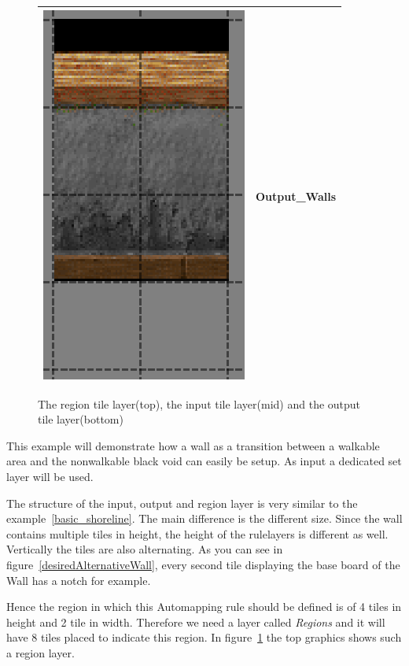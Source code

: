 \begin{figure}
\begin{tabular}{|c|l|}
	\hline
	\includegraphics[scale=0.5]{Example/LoneCoder/alternatingwalls/output.eps} & Output\_Walls\\
	\hline
	\end{tabular}
  \caption{The region tile layer(top), the input tile layer(mid) and the output tile layer(bottom)}
  \label{alternatingWallsRule}
\end{figure}

This example will demonstrate how a wall as a transition between a walkable 
area and the nonwalkable black void can easily be setup. 
As input a dedicated set layer will be used.

The structure of the input, output and region layer is very similar to the example~\ref{basic_shoreline}.
The main difference is the different size. Since the wall contains multiple tiles in height,
the height of the rulelayers is different as well. Vertically the tiles are also alternating. 
As you can see in figure~\ref{desiredAlternativeWall}, every second tile displaying the base board of the Wall has a notch for example.

Hence the region in which this Automapping rule should be defined is of 4 tiles in height and 
2 tile in width. Therefore we need a layer called \emph{Regions} and it will have 8 tiles placed
to indicate this region. In figure~\ref{alternatingWallsRule} the top graphics shows such a region
layer.

